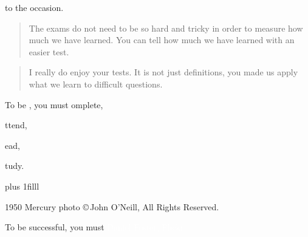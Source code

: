 \documentclass[t,handout]{beamer}  %
\begin{document}

{
\begin{frame}[b,plain]
\end{frame}
}


\begin{frame}{ to the occasion.}

\hangpara\begin{quote}The exams do not need to be so hard and tricky in order to measure how much we have learned. You can tell how much we have learned with an easier test.
\end{quote}

\hangpara\begin{quote}I really do enjoy your tests. It is not just definitions, you made us apply what we learn to difficult questions.
\end{quote}


\end{frame}

{

\begin{frame}[t]{To be , you must}
\vspace{1ex}
\hspace{22em}omplete,
\pause

\vspace{1ex}
\hspace{22em}ttend,
\pause

\vspace{1ex}
\hspace{22em}ead,
\pause

\vspace{1ex}
\hspace{22em}tudy.

\vskip 0pt plus 1filll

\tiny 1950 Mercury photo \copyright\,John O'Neill, All Rights Reserved.
\end{frame}
}

{
\begin{frame}[b,plain]{To be successful, you must }
\textcolor{white}{\tiny Daniel Foster, Flickr, }
\end{frame}
}
\end{document}
